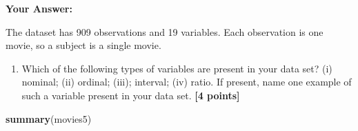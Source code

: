 \documentclass[
]{article}
\newenvironment{Shaded}{\begin{snugshade}}{\end{snugshade}}
\newcommand{\FunctionTok}[1]{\textcolor[rgb]{0.13,0.29,0.53}{\textbf{#1}}}
\newcommand{\NormalTok}[1]{#1}
\providecommand{\tightlist}{%
  \setlength{\itemsep}{0pt}\setlength{\parskip}{0pt}}
\begin{document}
\textbf{Your Answer:}

The dataset has 909 observations and 19 variables. Each observation is
one movie, so a subject is a single movie.

\begin{enumerate}
\def\labelenumi{\arabic{enumi}.}
\setcounter{enumi}{1}
\tightlist
\item
  Which of the following types of variables are present in your data
  set? (i) nominal; (ii) ordinal; (iii); interval; (iv) ratio. If
  present, name one example of such a variable present in your data set.
  \textbf{[4 points]}
\end{enumerate}

\begin{Shaded}
\begin{Highlighting}[]
\FunctionTok{summary}\NormalTok{(movies5)}
\end{Highlighting}
\end{Shaded}
\end{document}
